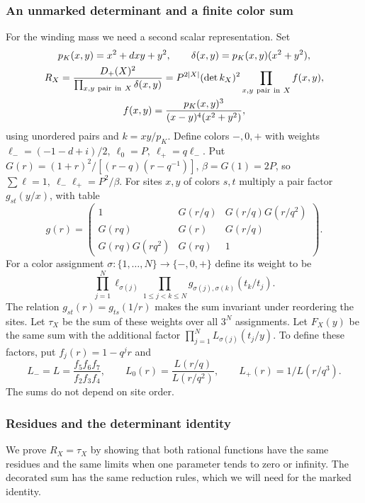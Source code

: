 \subsubsection{An unmarked determinant and a finite color sum}

For the winding mass we need a second scalar representation. Set
\[
 \begin{gathered}
 p_K(x,y)=x^2+dxy+y^2,\qquad \delta(x,y)=p_K(x,y)(x^2+y^2),\\
 R_X=\frac{D_+(X)^2}{\prod_{x,y\ {\rm pair\ in}\ X}\delta(x,y)}
   =P^{2|X|}(\det k_X)^2\prod_{x,y\ {\rm pair\ in}\ X}
           f(x,y),\\ f(x,y)=\frac{p_K(x,y)^3}{(x-y)^4(x^2+y^2)} ,
 \end{gathered}
\]
using unordered pairs and \(k=xy/p_K\). Define colors \(-,0,+\) with weights \(\ell_-=(-1-d+i)/2,\ \ell_0=P,\ \ell_+=q\ell_-\). Put \(G(r)=(1+r)^2/[(r-q)(r-q^{-1})]\), \(\beta=G(1)=2P\), so \(\sum\ell=1,\ \ell_-\ell_+=P^2/\beta\). For sites \(x,y\) of colors \(s,t\) multiply a pair factor \(g_{st}(y/x)\), with table
\[
 g(r)=\begin{pmatrix}
 1&G(r/q)&G(r/q)G(r/q^2)\\
 G(rq)&G(r)&G(r/q)\\
 G(rq)G(rq^2)&G(rq)&1
 \end{pmatrix}.
\]
For a color assignment $\sigma:\{1,\ldots,N\}\to\{-,0,+\}$
define its weight to be
\[
 \prod_{j=1}^N\ell_{\sigma(j)}
 \prod_{1\le j<k\le N}g_{\sigma(j),\sigma(k)}(t_k/t_j).
\]
The relation $g_{st}(r)=g_{ts}(1/r)$ makes the sum invariant under
reordering the sites. Let $\tau_X$ be the sum of these weights over all
$3^N$ assignments. Let $F_X(y)$ be the same sum with the additional factor
$\prod_{j=1}^N L_{\sigma(j)}(t_j/y)$. To define these factors, put
\(f_j(r)=1-q^j r\) and
\[
 L_-=L=\frac{f_5 f_6 f_7}{f_2 f_3 f_4},\qquad
 L_0(r)=\frac{L(r/q)}{L(r/q^2)},\qquad L_+(r)=1/L(r/q^3).
\]
The sums do not depend on site order.

\subsubsection{Residues and the determinant identity}

We prove $R_X=\tau_X$ by showing that both rational functions have the
same residues and the same limits when one parameter tends to zero or
infinity. The decorated sum has the same reduction rules, which we will
need for the marked identity.

